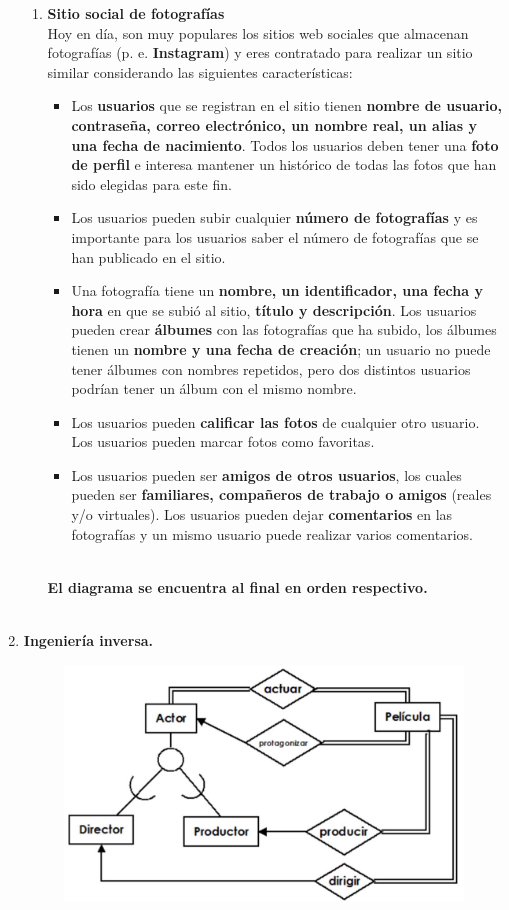 \documentclass{article}
\begin{document}
\begin{enumerate}
\begin{enumerate}
			
			\item \textbf{Sitio social de fotografías}
			\\Hoy en día, son muy populares los sitios web sociales que almacenan
			fotografías (p. e. \textbf{Instagram}) y eres contratado para realizar un sitio similar
			considerando las siguientes características:
				\begin{itemize}
					\item Los \textbf{usuarios} que se registran en el sitio tienen \textbf{nombre de usuario,
					contraseña, correo electrónico, un nombre real, un alias y una fecha de
					nacimiento}. Todos los usuarios deben tener una \textbf{foto de perfil} e interesa
					mantener un histórico de todas las fotos que han sido elegidas para este fin.
					\item Los usuarios pueden subir cualquier \textbf{número de fotografías} y es importante
					para los usuarios saber el número de fotografías que se han publicado en el sitio.
					\item Una fotografía tiene un \textbf{nombre, un identificador, una fecha y hora} en que se subió al sitio, \textbf{título
					y descripción}. Los usuarios pueden crear \textbf{álbumes} con las fotografías que ha subido, los álbumes tienen un \textbf{nombre y una fecha de creación}; un usuario no puede tener álbumes con nombres
					repetidos, pero dos distintos usuarios podrían tener un álbum con el mismo nombre.
					\item Los usuarios pueden \textbf{calificar las fotos} de cualquier otro usuario. Los usuarios pueden marcar
					fotos como favoritas.
					\item Los usuarios pueden ser \textbf{amigos de otros usuarios}, los cuales pueden ser \textbf{familiares, compañeros
					de trabajo o amigos} (reales y/o virtuales). Los usuarios pueden dejar \textbf{comentarios} en las
					fotografías y un mismo usuario puede realizar varios comentarios.\\\\
				\end{itemize}
			\textbf{El diagrama se encuentra al final en orden respectivo.}\\\\
			\end{enumerate}
		\item \textbf{Ingeniería inversa.}
			\begin{figure}[H]
				\centering
				\includegraphics[width=1\textwidth]{imagenes/IngenieraInversa}

\end{figure}
\end{enumerate}
\end{document}
